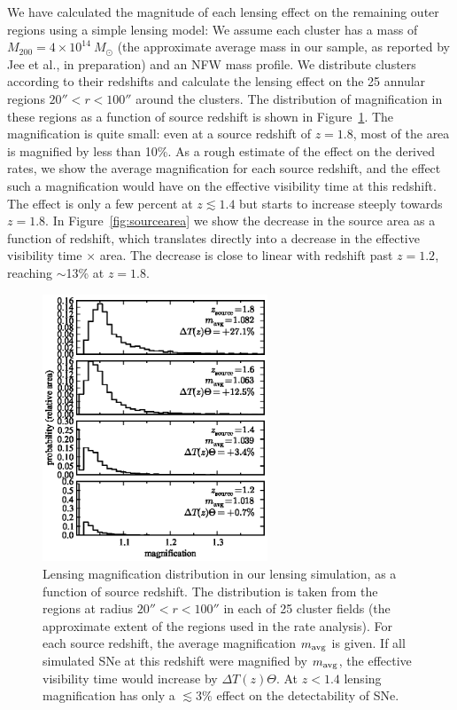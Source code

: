 We have calculated the magnitude of each lensing effect on the
remaining outer regions using a simple lensing model: We assume each
cluster has a mass of $M_{200} = 4\times 10^{14}~M_\odot$ (the
approximate average mass in our sample, as reported by Jee et al., in
preparation) and an NFW mass profile. We distribute clusters according
to their redshifts and calculate the lensing effect on the 25 annular
regions $20'' < r < 100''$ around the clusters. The distribution of
magnification in these regions as a function of source redshift is
shown in Figure~\ref{fig:magpdf}. The magnification is quite small:
even at a source redshift of $z=1.8$, most of the area is magnified by
less than 10\%. As a rough estimate of the effect on the derived
rates, we show the average magnification for each source redshift, and
the effect such a magnification would have on the effective visibility
time at this redshift. The effect is only a few percent at $z \lesssim
1.4$ but starts to increase steeply towards $z=1.8$. In
Figure~\ref{fig:sourcearea} we show the decrease in the source area as
a function of redshift, which translates directly into a decrease in
the effective visibility time $\times$ area. The decrease is close to
linear with redshift past $z=1.2$, reaching $\sim$13\% at $z=1.8$.


\begin{figure}
\includegraphics[width=0.6\textwidth]{figures/fieldrate/magpdf.eps}
\caption[Lensing magnification distribution in lensing simulation]
{Lensing magnification distribution in our lensing simulation, as a
function of source redshift. The distribution is taken from the
regions at radius $20'' < r < 100''$ in each of 25 cluster fields (the
approximate extent of the regions used in the rate analysis). For each
source redshift, the average magnification $m_{\rm avg}$ is given. If
all simulated SNe at this redshift were magnified by $m_{\rm avg}$,
the effective visibility time would increase by $\Delta
T(z) \Theta$. At $z<1.4$ lensing magnification has only a $\lesssim
3\%$ effect on the detectability of SNe.\label{fig:magpdf}}
\end{figure}


